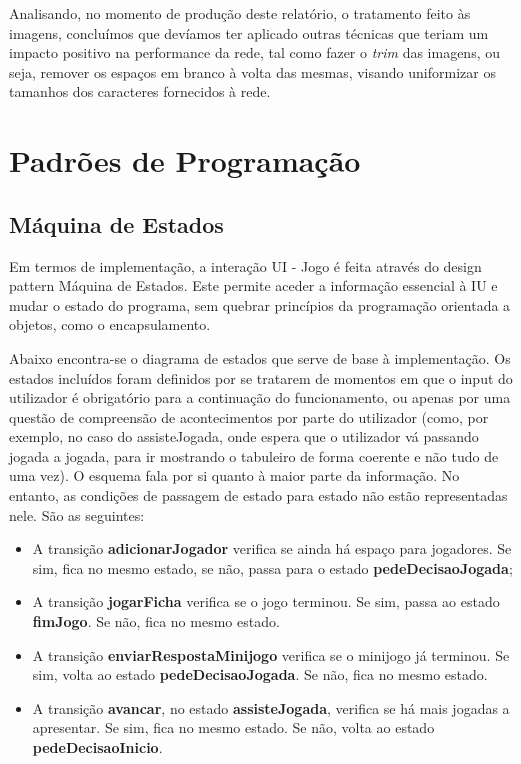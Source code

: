 \documentclass[11pt]{article}
\begin{document}
	Analisando, no momento de produção deste relatório, o tratamento feito às imagens, concluímos que devíamos ter aplicado outras técnicas que teriam um impacto positivo na performance da rede, tal como fazer o \textit{trim} das imagens, ou seja, remover os espaços em branco à volta das mesmas, visando uniformizar os tamanhos dos caracteres fornecidos à rede.

	\pagebreak
	
	\large
	\section{Padrões de Programação}
	\subsection{Máquina de Estados}
	\normalsize
	
	 Em termos de implementação, a interação UI - Jogo é feita através do design pattern Máquina de Estados. Este permite aceder a informação essencial à IU e mudar o estado do programa, sem quebrar princípios da programação orientada a objetos, como o encapsulamento.
	 
	 Abaixo encontra-se o diagrama de estados que serve de base à implementação. Os estados incluídos foram definidos por se tratarem de momentos em que o input do utilizador é obrigatório para a continuação do funcionamento, ou apenas por uma questão de compreensão de acontecimentos por parte do utilizador (como, por exemplo, no caso do assisteJogada, onde espera que o utilizador vá passando jogada a jogada, para ir mostrando o tabuleiro de forma coerente e não tudo de uma vez). O esquema fala por si quanto à maior parte da informação. No entanto, as condições de passagem de estado para estado não estão representadas nele. São as seguintes:
	 
	 \begin{itemize}
	 	\item A transição \textbf{adicionarJogador} verifica se ainda há espaço para jogadores. Se sim, fica no mesmo estado, se não, passa para o estado \textbf{pedeDecisaoJogada};
	 	\item A transição \textbf{jogarFicha} verifica se o jogo terminou. Se sim, passa ao estado \textbf{fimJogo}. Se não, fica no mesmo estado.
	 	\item A transição \textbf{enviarRespostaMinijogo} verifica se o minijogo já terminou. Se sim, volta ao estado \textbf{pedeDecisaoJogada}. Se não, fica no mesmo estado.
	 	\item A transição \textbf{avancar}, no estado \textbf{assisteJogada}, verifica se há mais jogadas a apresentar. Se sim, fica no mesmo estado. Se não, volta ao estado \textbf{pedeDecisaoInicio}.
	 \end{itemize}
	
\end{document}

